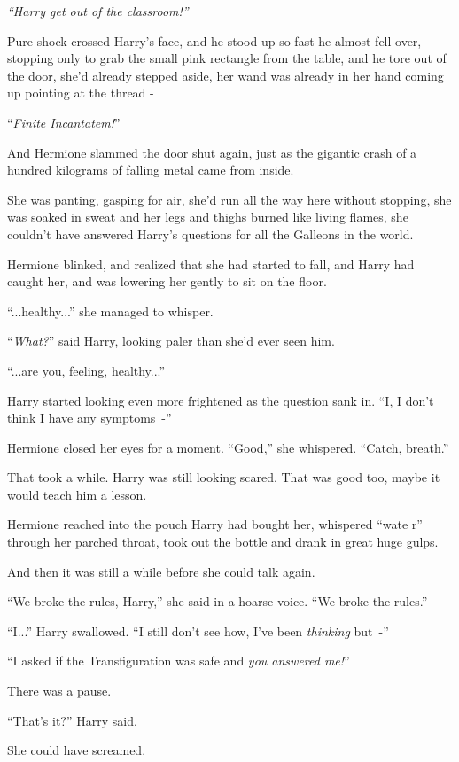\emph{``Harry get out of the classroom!''}

Pure shock crossed Harry's face, and he stood up so fast he almost fell over, stopping only to grab the small pink rectangle from the table, and he tore out of the door, she'd already stepped aside, her wand was already in her hand coming up pointing at the thread -

``\emph{Finite Incantatem!}''

And Hermione slammed the door shut again, just as the gigantic crash of a hundred kilograms of falling metal came from inside.

She was panting, gasping for air, she'd run all the way here without stopping, she was soaked in sweat and her legs and thighs burned like living flames, she couldn't have answered Harry's questions for all the Galleons in the world.

Hermione blinked, and realized that she had started to fall, and Harry had caught her, and was lowering her gently to sit on the floor.

``...healthy...'' she managed to whisper.

``\emph{What?}'' said Harry, looking paler than she'd ever seen him.

``...are you, feeling, healthy...''

Harry started looking even more frightened as the question sank in. ``I, I don't think I have any symptoms~-''

Hermione closed her eyes for a moment. ``Good,'' she whispered. ``Catch, breath.''

That took a while. Harry was still looking scared. That was good too, maybe it would teach him a lesson.

Hermione reached into the pouch Harry had bought her, whispered ``wate r'' through her parched throat, took out the bottle and drank in great huge gulps.

And then it was still a while before she could talk again.

``We broke the rules, Harry,'' she said in a hoarse voice. ``We broke the rules.''

``I...'' Harry swallowed. ``I still don't see how, I've been \emph{thinking} but~-''

``I asked if the Transfiguration was safe and \emph{you answered me!}''

There was a pause.

``That's it?'' Harry said.

She could have screamed.

